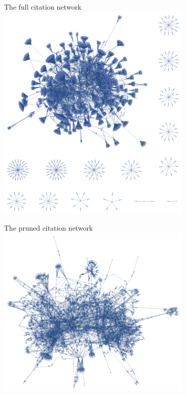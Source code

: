 \documentclass[xcolor=dvipsnames, 14pt]{beamer}
\begin{document}
\begin{frame}{The full citation network}
\centering
\includegraphics[width=0.7\textwidth]{full_citation_network.png}
\end{frame}

\begin{frame}{The pruned citation network}
\centering
\includegraphics[width=0.7\textwidth]{subnetwork.png}
\end{frame}
\end{document}
